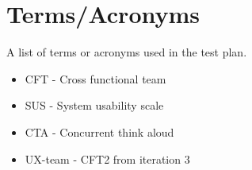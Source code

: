 \section{Terms/Acronyms}
\noindent A list of terms or acronyms used in the test plan.\newline  
\begin{itemize}
  \item CFT - Cross functional team
  \item SUS - System usability scale
  \item CTA - Concurrent think aloud
  \item UX-team - CFT2 from iteration 3
\end{itemize}